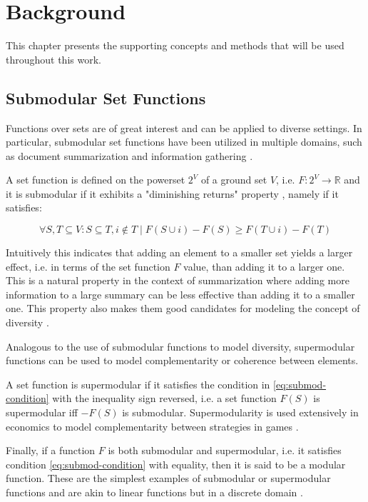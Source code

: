 \chapter{Background}
\label{sec:background}

This chapter presents the supporting concepts and methods that will be used throughout this work.

\section{Submodular Set Functions}

Functions over sets are of great interest and can be applied to diverse settings. In particular, submodular set functions have been utilized in multiple domains, such as document summarization and information gathering \citep{krause14submodular}.

A set function is defined on the powerset $2^{V}$ of a ground set $V$, i.e. $F:2^{V} \rightarrow \mathbb{R}$ and it is submodular if it exhibits a "diminishing returns" property \citep{krause14submodular}, namely if it satisfies:

\begin{equation}
  \label{eq:submod-condition}
  \forall S,T \subseteq V : S \subseteq T, i \notin T \mid F(S \cup i) - F(S) \geq F(T \cup i) - F(T)
\end{equation}

Intuitively this indicates that adding an element to a smaller set yields a larger effect, i.e. in terms of the set function $F$ value, than adding it to a larger one. This is a natural property in the context of summarization where adding more information to a large summary can be less effective than adding it to a smaller one. This property also makes them good candidates for modeling the concept of diversity \citep{tschiatschek16learning}.

Analogous to the use of submodular functions to model diversity, supermodular functions can be used to model complementarity or coherence between elements.

A set function is supermodular if it satisfies the condition in \eqref{eq:submod-condition} with the inequality sign reversed, i.e. a set function $F(S)$ is supermodular iff $-F(S)$ is submodular. Supermodularity is used extensively in economics to model complementarity between strategies in games \citep{amir2005supermodularity}.

Finally, if a function $F$ is both submodular and supermodular, i.e. it satisfies condition \eqref{eq:submod-condition} with equality, then it is said to be a modular function. These are the simplest examples of submodular or supermodular functions and are akin to linear functions but in a discrete domain \citep{krause14submodular}.

